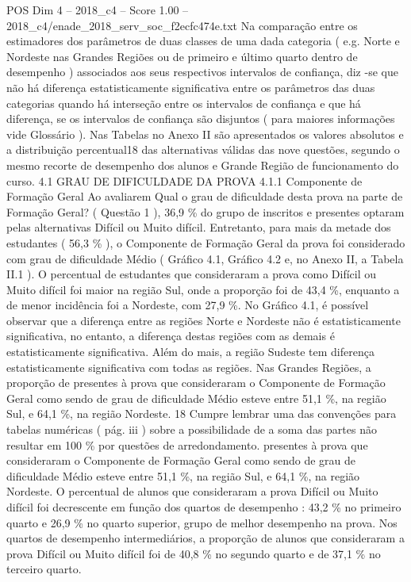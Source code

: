 \begin{textsample}{POS Dim 4 – 2018\_c4 – Score 1.00 – 2018\_c4/enade\_2018\_serv\_soc\_f2ecfc474e.txt}
Na comparação entre os estimadores dos parâmetros de duas classes de uma dada categoria ( e.g.
Norte e Nordeste nas Grandes Regiões ou de primeiro e último quarto dentro de desempenho ) associados aos seus respectivos intervalos de confiança, diz -se que não há diferença estatisticamente significativa entre os parâmetros das duas categorias quando há interseção entre os intervalos de confiança e que há diferença, se os intervalos de confiança são disjuntos ( para maiores informações vide Glossário ).
Nas Tabelas no Anexo II são apresentados os valores absolutos e a distribuição percentual18 das alternativas válidas das nove questões, segundo o mesmo recorte de desempenho dos alunos e Grande Região de funcionamento do curso. 4.1 GRAU DE DIFICULDADE DA PROVA 4.1.1 Componente de Formação Geral Ao avaliarem Qual o grau de dificuldade desta prova na parte de Formação Geral? ( Questão 1 ), 36,9 \% do grupo de inscritos e presentes optaram pelas alternativas Difícil ou Muito difícil.
Entretanto, para mais da metade dos estudantes ( 56,3 \% ), o Componente de Formação Geral da prova foi considerado com grau de dificuldade Médio ( Gráfico 4.1, Gráfico 4.2 e, no Anexo II, a Tabela II.1 ).
O percentual de estudantes que consideraram a prova como Difícil ou Muito difícil foi maior na região Sul, onde a proporção foi de 43,4 \%, enquanto a de menor incidência foi a Nordeste, com 27,9 \%.
No Gráfico 4.1, é possível observar que a diferença entre as regiões Norte e Nordeste não é estatisticamente significativa, no entanto, a diferença destas regiões com as demais é estatisticamente significativa.
Além do mais, a região Sudeste tem diferença estatisticamente significativa com todas as regiões.
Nas Grandes Regiões, a proporção de presentes à prova que consideraram o Componente de Formação Geral como sendo de grau de dificuldade Médio esteve entre 51,1 \%, na região Sul, e 64,1 \%, na região Nordeste. 18 Cumpre lembrar uma das convenções para tabelas numéricas ( pág. iii ) sobre a possibilidade de a soma das partes não resultar em 100 \% por questões de arredondamento. presentes à prova que consideraram o Componente de Formação Geral como sendo de grau de dificuldade Médio esteve entre 51,1 \%, na região Sul, e 64,1 \%, na região Nordeste.
O percentual de alunos que consideraram a prova Difícil ou Muito difícil foi decrescente em função dos quartos de desempenho : 43,2 \% no primeiro quarto e 26,9 \% no quarto superior, grupo de melhor desempenho na prova.
Nos quartos de desempenho intermediários, a proporção de alunos que consideraram a prova Difícil ou Muito difícil foi de 40,8 \% no segundo quarto e de 37,1 \% no terceiro quarto.

\end{textsample}
